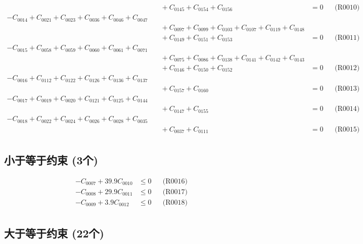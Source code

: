 \documentclass[a4paper,10pt]{article}
\begin{document}
{\begin{align}
&\quad  + C_{0145} + C_{0154} + C_{0156} &= 0 && \text{(R0010)} \\
-C_{0014} + C_{0021} + C_{0023} + C_{0036} + C_{0046} + C_{0047} \\[0.5ex]
&\quad  + C_{0097} + C_{0099} + C_{0103} + C_{0107} + C_{0119} + C_{0148} \\[0.5ex]
&\quad  + C_{0149} + C_{0151} + C_{0153} &= 0 && \text{(R0011)} \\
-C_{0015} + C_{0058} + C_{0059} + C_{0060} + C_{0061} + C_{0071} \\[0.5ex]
&\quad  + C_{0075} + C_{0086} + C_{0138} + C_{0141} + C_{0142} + C_{0143} \\[0.5ex]
&\quad  + C_{0146} + C_{0150} + C_{0152} &= 0 && \text{(R0012)} \\
-C_{0016} + C_{0112} + C_{0122} + C_{0126} + C_{0136} + C_{0137} \\[0.5ex]
&\quad  + C_{0157} + C_{0160} &= 0 && \text{(R0013)} \\
-C_{0017} + C_{0019} + C_{0020} + C_{0121} + C_{0125} + C_{0144} \\[0.5ex]
&\quad  + C_{0147} + C_{0155} &= 0 && \text{(R0014)} \\
-C_{0018} + C_{0022} + C_{0024} + C_{0026} + C_{0028} + C_{0035} \\[0.5ex]
&\quad  + C_{0037} + C_{0111} &= 0 && \text{(R0015)} \\
\end{align}}

\subsection{小于等于约束 (3个)}

\allowdisplaybreaks
{\small\begin{align}
-C_{0007} + 39.9C_{0010} &\leq 0 && \text{(R0016)} \\
-C_{0008} + 29.9C_{0011} &\leq 0 && \text{(R0017)} \\
-C_{0009} + 3.9C_{0012} &\leq 0 && \text{(R0018)} \\
\end{align}}

\subsection{大于等于约束 (22个)}
\end{document}
